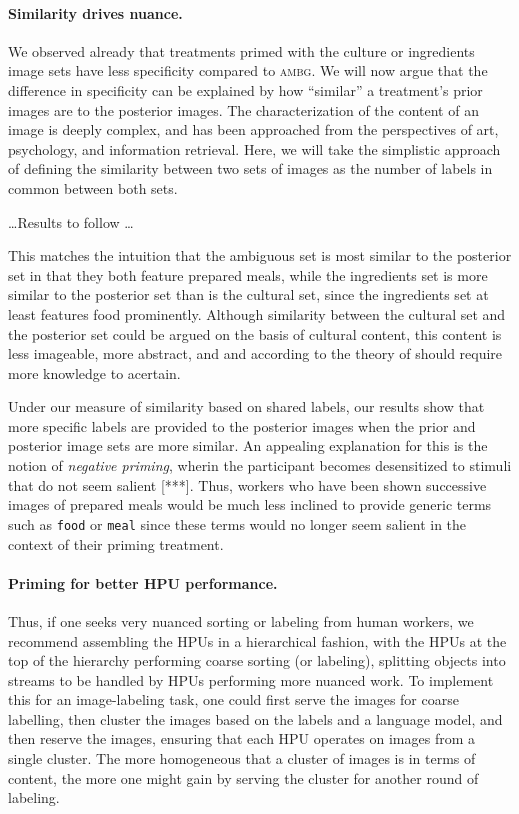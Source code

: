 \documentclass[a4paper]{report}
\begin{document}
\paragraph{Similarity drives nuance.}
We observed already that treatments primed with the 
culture or ingredients image sets have less specificity compared to 
\textsc{ambg}.  We will now argue that the difference in specificity
can be explained by how ``similar'' a treatment's prior 
images are to the posterior images. The characterization of the content of an 
image is deeply complex, and has been approached from the perspectives of art\cite{panofsky1939studies,shatford1986analyzing},
psychology\cite{Tversky1977327}, and information retrieval\cite{Jaimes20002}.  Here, we will take the simplistic 
approach of defining the similarity between two sets of images as the number of
labels in common between both sets.

\dots Results to follow \dots

This matches the intuition that the ambiguous set is most similar to the 
posterior set in that they both feature prepared meals, while the ingredients
set is more similar to the posterior set than is the cultural set, since the
ingredients set at least features food prominently.  Although similarity 
between the cultural set and the posterior set could be argued on the basis
of cultural content, this content is less imageable, more abstract, and
and according to the theory of \cite{Jaimes20002} should require more 
knowledge to acertain.

Under our measure of similarity based on shared labels, our results show that
more specific labels are provided to the posterior images when the prior and
posterior image sets are more similar.
An appealing explanation for 
this is the notion of \textit{negative priming}, wherin the participant
becomes desensitized to stimuli that do not seem salient [***].  Thus, workers 
who have been shown successive images of prepared meals 
would be much less inclined to provide generic terms such as \texttt{food} or 
\texttt{meal} since these terms would no longer seem salient in the 
context of their priming treatment.  

\paragraph{Priming for better HPU performance.}
Thus, if one seeks very nuanced sorting or labeling from human workers, 
we recommend assembling the HPUs in a hierarchical fashion, with the 
HPUs at the top of the hierarchy performing coarse sorting (or labeling), 
splitting objects into streams to be handled by HPUs performing more nuanced 
work.  To implement this for an
image-labeling task, one could first serve the images for coarse labelling,
then cluster the images based on the labels and a language model, and then 
reserve the images, ensuring that each HPU operates on images from a single 
cluster.  The more homogeneous that a cluster of images is in terms of 
content, the more one might gain by serving the cluster for another round of
labeling.
\end{document}
